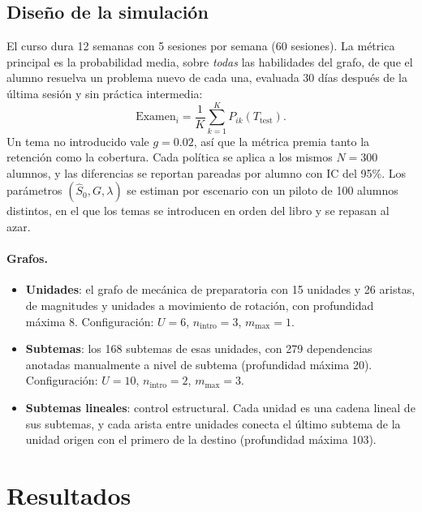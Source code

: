 \documentclass[11pt]{article}
\theoremstyle{definition}
\theoremstyle{remark}
\newcommand{\Sh}{\hat S}
\begin{document}
\subsection{Diseño de la simulación}

El curso dura 12 semanas con 5 sesiones por semana (60 sesiones). La métrica principal es la probabilidad media, sobre \emph{todas} las habilidades del grafo, de que el alumno resuelva un problema nuevo de cada una, evaluada 30 días después de la última sesión y sin práctica intermedia:
\begin{equation}
\text{Examen}_i=\frac1K\sum_{k=1}^K P_{ik}(T_{\mathrm{test}}).
\label{eq:examen}
\end{equation}
Un tema no introducido vale $g=0.02$, así que la métrica premia tanto la retención como la cobertura. Cada política se aplica a los mismos $N=300$ alumnos, y las diferencias se reportan pareadas por alumno con IC del 95\%. Los parámetros $(\Sh_0,G,\lambda)$ se estiman por escenario con un piloto de 100 alumnos distintos, en el que los temas se introducen en orden del libro y se repasan al azar.

\paragraph{Grafos.}
\begin{itemize}
\item \textbf{Unidades}: el grafo de mecánica de preparatoria con 15 unidades y 26 aristas, de magnitudes y unidades a movimiento de rotación, con profundidad máxima 8. Configuración: $U=6$, $n_{\mathrm{intro}}=3$, $m_{\max}=1$.
\item \textbf{Subtemas}: los 168 subtemas de esas unidades, con 279 dependencias anotadas manualmente a nivel de subtema (profundidad máxima 20). Configuración: $U=10$, $n_{\mathrm{intro}}=2$, $m_{\max}=3$.
\item \textbf{Subtemas lineales}: control estructural. Cada unidad es una cadena lineal de sus subtemas, y cada arista entre unidades conecta el último subtema de la unidad origen con el primero de la destino (profundidad máxima 103).
\end{itemize}

\section{Resultados}
\label{sec:resultados}
\end{document}
